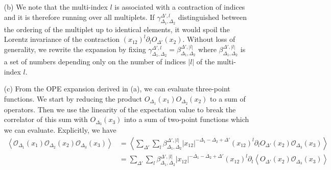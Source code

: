 \documentclass[10pt, a4paper]{article}
\begin{document}
{\begin{enumerate}
  \begin{align*}
    \beta^{\Delta', l}_{\Delta_1, \Delta_2} |x_{12}|^\Delta (x_{12})^{l} = \lambda^{\Delta_1 + \Delta_2-\Delta' - |l|} \gamma^{\Delta', l}_{\Delta_1, \Delta_2} \lambda^{\Delta} |x_{12}|^\Delta \lambda^{|l|} (x_{12})^{l} \implies \Delta = -\Delta_1 - \Delta_2+\Delta'
  \end{align*}
  leading to the expansion 
  \begin{align*}
    \mathcal{O}_{\Delta_1}\left(x_1\right) \mathcal{O}_{\Delta_2}\left(x_2\right) = \sum_{\Delta'} \sum_l \gamma^{\Delta', l}_{\Delta_1, \Delta_2} |x_{12}|^{-\Delta_1 - \Delta_2+\Delta'} (x_{12})^{l} \partial_{l} O_{\Delta'}(x_2)
  \end{align*}
  with $l_i \geq 0,\ \forall l_i \in l$. 
  \item[(b)] We note that the multi-index $l$ is associated with a contraction of indices and it is therefore running over all multiplets. If $\gamma^{\Delta', l}_{\Delta_1, \Delta_2}$ distinguished between the ordering of the multiplet up to identical elements, it would spoil the Lorentz invariance of the contraction $(x_{12})^{l} \partial_{l} O_{\Delta'}(x_2)$. Without loss of generality, we rewrite the expansion by fixing $\gamma^{\Delta', l}_{\Delta_1, \Delta_2} = \beta^{\Delta', |l|}_{\Delta_1, \Delta_2}$ where $\beta^{\Delta', |l|}_{\Delta_1, \Delta_2}$ is a set of numbers depending only on the number of indices $|l|$ of the multi-index $l$.
  \item[(c)] From the OPE expansion derived in (a), we can evaluate three-point functions. We start by reducing the product $O_{\Delta_1}(x_1) O_{\Delta_2}(x_2)$ to a sum of operators. Then we use the linearity of the expectation value to break the correlator of this sum with $O_{\Delta_3}(x_3)$ into a sum of two-point functions which we can evaluate. Explicitly, we have
  \begin{align*}
    \left\langle\mathcal{O}_{\Delta_1}\left(x_1\right) \mathcal{O}_{\Delta_2}\left(x_2\right) \mathcal{O}_{\Delta_3}\left(x_3\right)\right\rangle &= \left\langle \sum_{\Delta'} \sum_l \beta^{\Delta', |l|}_{\Delta_1, \Delta_2} |x_{12}|^{-\Delta_1 - \Delta_2+\Delta'} (x_{12})^{l} \partial_{l} O_{\Delta'}(x_2) \mathcal{O}_{\Delta_3}\left(x_3\right)\right\rangle\\
    &=\sum_{\Delta'}  \sum_l \beta^{\Delta', |l|}_{\Delta_1, \Delta_2} |x_{12}|^{-\Delta_1 - \Delta_2+\Delta'} (x_{12})^{l} \partial_{l} \left\langle    O_{\Delta'}(x_2) \mathcal{O}_{\Delta_3}\left(x_3\right)\right\rangle\\

\end{align*}
\end{enumerate}}
\end{document}
